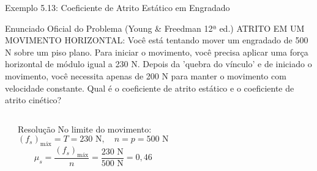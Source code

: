 \documentclass[10pt,aspectratio=169]{beamer}
\begin{document}
\begin{frame}{Exemplo 5.13: Coeficiente de Atrito Estático em Engradado}
    \begin{block}{Enunciado Oficial do Problema (Young \& Freedman 12ª ed.)}
        \small
        ATRITO EM UM MOVIMENTO HORIZONTAL: Você está tentando mover um engradado de 500 N sobre um piso plano. Para iniciar o movimento, você precisa aplicar uma força horizontal de módulo igual a 230 N. Depois da 'quebra do vínculo' e de iniciado o movimento, você necessita apenas de 200 N para manter o movimento com velocidade constante. Qual é o coeficiente de atrito estático e o coeficiente de atrito cinético?
    \end{block}
    \begin{columns}[T]
        \begin{center}
        \end{center}
        \begin{exampleblock}{Resolução}
            \small
            No limite do movimento:
            $$(f_s)_{\text{máx}} = T = 230\text{ N}, \quad n = p = 500\text{ N}$$
            $$\mu_s = \frac{(f_s)_{\text{máx}}}{n} = \frac{230\text{ N}}{500\text{ N}} = 0{,}46$$
        \end{exampleblock}
    \end{columns}
\end{frame}
\end{document}
